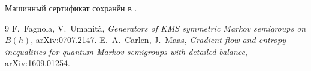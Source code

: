 Машинный сертификат сохранён в
.

\begin{thebibliography}{9}
F.~Fagnola, V.~Umanit\`a, \emph{Generators of KMS symmetric Markov
semigroups on $B(h)$}, arXiv:0707.2147.
E.~A.~Carlen, J.~Maas, \emph{Gradient flow and entropy inequalities for
quantum Markov semigroups with detailed balance}, arXiv:1609.01254.
\end{thebibliography}